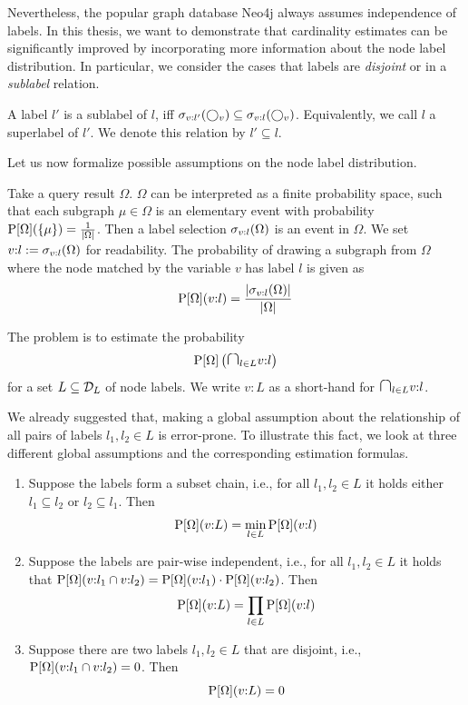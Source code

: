 Nevertheless, the popular graph database Neo4j always assumes independence
of labels.
In this thesis, we want to demonstrate that cardinality estimates can be
significantly improved by incorporating more information about the node label
distribution. In particular, we consider the cases that labels are
\emph{disjoint} or
in a \emph{sublabel} relation.

\begin{definition}[Sublabels]
\label{def:sublabel}
A label $l'$ is a sublabel of $l$, iff
$\sigma_{v:l'}(\bigcirc_{v}) \subseteq \sigma_{v:l}(\bigcirc_{v})$.
Equivalently, we call $l$ a superlabel of $l'$.
We denote this relation by $l' \subseteq l$.
\end{definition}

Let us now formalize possible assumptions on the node label distribution.

Take a query result $\Omega$. $\Omega$ can be interpreted as a finite
probability space, such that each subgraph $\mu \in \Omega$ is an elementary
event with probability $\operatorname{P}[\Omega](\{\mu\}) = \frac{1}{{\left \vert \Omega \right \vert}}$.
Then a label selection $\sigma_{v:l}(\Omega)$ is an event in $\Omega$. We
set $v{:}l := \sigma_{v:l}(\Omega)$ for readability. The probability of
drawing a subgraph from $\Omega$ where the node matched by the variable $v$
has label $l$ is given as
\begin{align}
  \operatorname{P}[\Omega](v{:}l) = \frac{{\left \vert \sigma_{v:l}(\Omega) \right \vert}}{{\left \vert \Omega \right \vert}}
  \label{eq:label-probability}
\end{align}

The problem is to estimate the probability
\[
  \prob{\Omega} \lb \bigisect_{l \in L} v{:}l \rb
\]
for a set $L \subseteq \mathcal{D}_L$ of node labels.
We write $v{:}L$ as a short-hand for $\bigisect_{l \in L} v{:}l$.

We already suggested that, making a global assumption about
the relationship of all pairs of labels $l_1, l_2 \in L$ is error-prone.
To illustrate this fact, we look at three different
global assumptions and the corresponding estimation formulas.
\begin{enumerate}
  \item Suppose the labels form a subset chain, i.e., for all $l_1, l_2 \in L$
    it holds either $l_1 \subseteq l_2$ or $l_2 \subseteq l_1$.
    Then
    \[
      \operatorname{P}[\Omega](v{:}L) = \min_{l \in L} \operatorname{P}[\Omega](v{:}l)
      \label{ass:chain}
    \]
  \item Suppose the labels are pair-wise independent, i.e., for all $l_1, l_2 \in L$
    it holds that
    $\operatorname{P}[\Omega](v{:}l_1 \cap v{:}l_2) = \operatorname{P}[\Omega](v{:}l_1) \cdot \operatorname{P}[\Omega](v{:}l_2)$.
    Then
    \[
      \operatorname{P}[\Omega](v{:}L) = \prod_{l \in L} \operatorname{P}[\Omega](v{:}l)
      \label{ass:ind}
    \]
  \item Suppose there are two labels $l_1, l_2 \in L$ that are disjoint, i.e.,
    $\operatorname{P}[\Omega](v{:}l_1 \cap v{:}l_2) = 0$.
    Then
    \[
      \operatorname{P}[\Omega](v{:}L) = 0
      \label{ass:disj}
    \]
\end{enumerate}

